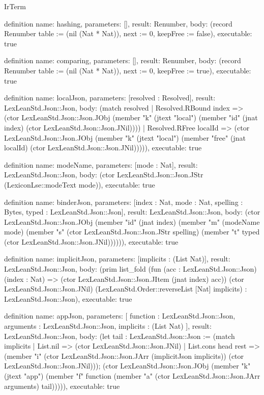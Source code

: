 \begin{lexlean}{IrTerm}
\begin{semanticmodule}
definition{
  name: hashing,
  parameters: [],
  result: Renumber,
  body: (record Renumber {table := (nil (Nat * Nat)), next := 0, keepFree := false}),
  executable: true
}

definition{
  name: comparing,
  parameters: [],
  result: Renumber,
  body: (record Renumber {table := (nil (Nat * Nat)), next := 0, keepFree := true}),
  executable: true
}

definition{
  name: localJson,
  parameters: [resolved : Resolved],
  result: LexLeanStd.Json::Json,
  body: (match resolved
    | Resolved.RBound index => (ctor LexLeanStd.Json::Json.JObj (member "k" (jtext "local") (member "id" (jnat index) (ctor LexLeanStd.Json::Json.JNil))))
    | Resolved.RFree localId => (ctor LexLeanStd.Json::Json.JObj (member "k" (jtext "local") (member "free" (jnat localId) (ctor LexLeanStd.Json::Json.JNil))))),
  executable: true
}

definition{
  name: modeName,
  parameters: [mode : Nat],
  result: LexLeanStd.Json::Json,
  body: (ctor LexLeanStd.Json::Json.JStr (LexiconLse::modeText mode)),
  executable: true
}

definition{
  name: binderJson,
  parameters: [index : Nat, mode : Nat, spelling : Bytes, typed : LexLeanStd.Json::Json],
  result: LexLeanStd.Json::Json,
  body: (ctor LexLeanStd.Json::Json.JObj (member "id" (jnat index) (member "m" (modeName mode) (member "s" (ctor LexLeanStd.Json::Json.JStr spelling) (member "t" typed (ctor LexLeanStd.Json::Json.JNil)))))),
  executable: true
}

definition{
  name: implicitJson,
  parameters: [implicits : (List Nat)],
  result: LexLeanStd.Json::Json,
  body: (prim list_fold (fun (acc : LexLeanStd.Json::Json) (index : Nat) => (ctor LexLeanStd.Json::Json.JItem (jnat index) acc)) (ctor LexLeanStd.Json::Json.JNil) (LexLeanStd.Order::reverseList [Nat] implicits) : LexLeanStd.Json::Json),
  executable: true
}

definition{
  name: appJson,
  parameters: [
    function : LexLeanStd.Json::Json,
    arguments : LexLeanStd.Json::Json,
    implicits : (List Nat)
  ],
  result: LexLeanStd.Json::Json,
  body: (let tail : LexLeanStd.Json::Json := (match implicits
    | List.nil => (ctor LexLeanStd.Json::Json.JNil)
    | List.cons head rest => (member "i" (ctor LexLeanStd.Json::Json.JArr (implicitJson implicits)) (ctor LexLeanStd.Json::Json.JNil))); (ctor LexLeanStd.Json::Json.JObj (member "k" (jtext "app") (member "f" function (member "a" (ctor LexLeanStd.Json::Json.JArr arguments) tail))))),
  executable: true
}


\end{semanticmodule}
\end{lexlean}
